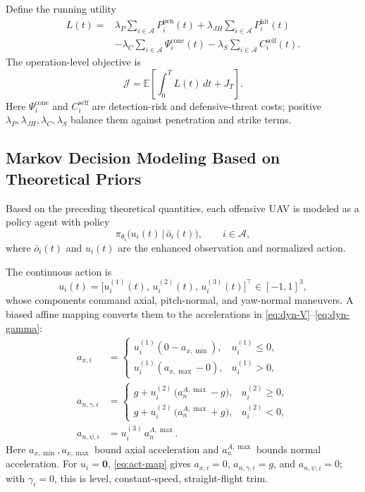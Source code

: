 \documentclass[unbranded]{cja}
\begin{document}
Define the running utility
\begin{equation}
\begin{aligned}
L(t)
={}&
\lambda_P \sum_{i\in\mathcal{A}} P_i^{\mathrm{pen}}(t)
+
\lambda_{JH} \sum_{i\in\mathcal{A}} P_i^{\mathrm{hit}}(t)\\
&
-
\lambda_C \sum_{i\in\mathcal{A}} \Psi_i^{\mathrm{cone}}(t)
-
\lambda_S \sum_{i\in\mathcal{A}} C_i^{\mathrm{self}}(t).
\end{aligned}
\label{eq:running-utility}
\end{equation}
The operation-level objective is
\begin{equation}
\mathcal J
=
\mathbb E\!\left[
\int_0^T L(t)\,dt+J_T
\right].
\end{equation}
Here $\Psi_i^{\mathrm{cone}}$ and $C_i^{\mathrm{self}}$ are detection-risk and defensive-threat costs; positive $\lambda_P,\lambda_{JH},\lambda_C,\lambda_S$ balance them against penetration and strike terms.

\subsection{Markov Decision Modeling Based on Theoretical Priors}
\label{subsec:rl-design}

Based on the preceding theoretical quantities, each offensive UAV is modeled as a policy agent with policy
\begin{equation}
\pi_{\theta_i}\bigl(u_i(t)\,\big|\,\bar o_i(t)\bigr),\qquad i\in\mathcal{A},
\end{equation}
where $\bar o_i(t)$ and $u_i(t)$ are the enhanced observation and normalized action.

The continuous action is
\begin{equation}
u_i(t)=\bigl[u_i^{(1)}(t),\,u_i^{(2)}(t),\,u_i^{(3)}(t)\bigr]^{\top}\in[-1,1]^3,
\label{eq:rl-action}
\end{equation}
whose components command axial, pitch-normal, and yaw-normal maneuvers. A biased affine mapping converts them to the accelerations in \eqref{eq:dyn-V}--\eqref{eq:dyn-gamma}:
\begin{equation}
\begin{aligned}
a_{x,i}
&=
\begin{cases}
u_i^{(1)}(0-a_{x,\min}), & u_i^{(1)}\le0,\\
u_i^{(1)}(a_{x,\max}-0), & u_i^{(1)}>0,
\end{cases}\\
a_{n,\gamma,i}
&=
\begin{cases}
g+u_i^{(2)}\,\bigl(a_n^{A,\max}-g\bigr), & u_i^{(2)}\ge 0,\\[2pt]
g+u_i^{(2)}\,\bigl(a_n^{A,\max}+g\bigr), & u_i^{(2)}<0,
\end{cases}
\\
a_{n,\psi,i}
&=u_i^{(3)}\,a_n^{A,\max}.
\end{aligned}
\label{eq:act-map}
\end{equation}
Here $a_{x,\min},a_{x,\max}$ bound axial acceleration and $a_n^{A,\max}$ bounds normal acceleration. For $u_i=\mathbf0$, \eqref{eq:act-map} gives $a_{x,i}=0$, $a_{n,\gamma,i}=g$, and $a_{n,\psi,i}=0$; with $\gamma_i=0$, this is level, constant-speed, straight-flight trim.
\end{document}
